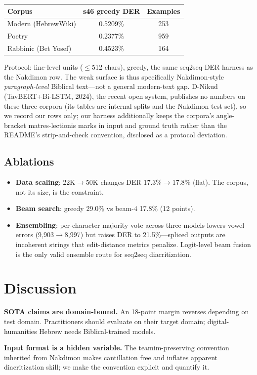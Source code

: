 \documentclass[11pt]{article}
\begin{document}
\begin{tabular}{lcc}
\toprule
Corpus & s46 greedy DER & Examples \\
\midrule
Modern (HebrewWiki) & 0.5209\% & 253 \\
Poetry & 0.2377\% & 959 \\
Rabbinic (Bet Yosef) & 0.4523\% & 164 \\
\bottomrule
\end{tabular}

Protocol: line-level units ($\leq$512 chars), greedy, the same
seq2seq DER harness as the Nakdimon row. The weak surface is thus
specifically Nakdimon-style \emph{paragraph-level} Biblical text---not
a general modern-text gap. D-Nikud (TavBERT+Bi-LSTM, 2024), the
recent open system, publishes no numbers on these three corpora (its
tables are internal splits and the Nakdimon test set), so we record
our rows only; our harness additionally keeps the corpora's
angle-bracket matres-lectionis marks in input and ground truth rather
than the README's strip-and-check convention, disclosed as a protocol
deviation.

\subsection{Ablations}
\begin{itemize}
  \item \textbf{Data scaling}: 22K$\to$50K changes DER 17.3\%$\to$17.8\%
        (flat). The corpus, not its size, is the constraint.
  \item \textbf{Beam search}: greedy 29.0\% vs beam-4 17.8\% (12 points).
  \item \textbf{Ensembling}: per-character majority vote across three
        models lowers vowel errors (9,903$\to$8,997) but raises DER to
        21.5\%---spliced outputs are incoherent strings that
        edit-distance metrics penalize. Logit-level beam fusion is the
        only valid ensemble route for seq2seq diacritization.
\end{itemize}

\section{Discussion}
\textbf{SOTA claims are domain-bound.} An 18-point margin reverses
depending on test domain. Practitioners should evaluate on their target
domain; digital-humanities Hebrew needs Biblical-trained models.

\textbf{Input format is a hidden variable.} The teamim-preserving
convention inherited from Nakdimon makes cantillation free and inflates
apparent diacritization skill; we make the convention explicit and
quantify it.
\end{document}
